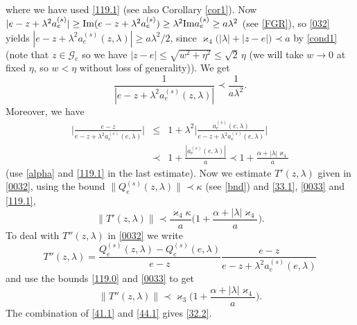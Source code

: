 \documentclass[letterpaper,onecolumn,11pt,accepted=2021-12-09]{quantumarticle}
\numberwithin{equation}{section}
\newcommand{\aes}{a_e^{(s)}}
\newcommand{\Qes}{Q_e^{(s)}}
\begin{document}
where we have used \eqref{119.1} (see also Corollary \ref{cor1}). Now $|e-z+\lambda^2\aes|\ge {\rm Im} ( e-z+\lambda^2\aes)
\ge \lambda^2{\rm Im }\aes \ge a \lambda^2$ (see \eqref{FGR}), so \eqref{032} yields $|e-z+\lambda^2 \aes(z,\lambda)|\ge a\lambda^2/2$, since $\varkappa_4\big(|\lambda| +|z-e|\big) \prec a$ by \eqref{cond1} (note that $z\in{\mathcal G}_e$ so we have $|z-e|\le \sqrt{w^2+\eta^2}\le \sqrt2 \,\eta$ (we will take $w\rightarrow 0$ at fixed $\eta$, so $w<\eta$ without loss of generality)). We get 
\begin{equation}
	\label{33.1}
	\frac{1}{|e-z+\lambda^2 \aes(z,\lambda)|}\prec \frac{1}{a \lambda^2}.
\end{equation} 
Moreover, we have
\begin{eqnarray} 
\Big| \frac{e-z}{e-z+\lambda^2\aes(e,\lambda)}\Big| &\le& 1 +\lambda^2\Big|
\frac{\aes(e,\lambda)}{e-z+\lambda^2\aes(e,\lambda)} \Big|\nonumber\\
&\prec& 1+\frac{|\aes(e,\lambda)|}{a} \prec 1+ \frac{\alpha +|\lambda|\varkappa_4}{a}
	\label{0033}
\end{eqnarray} 
(use \eqref{alpha} and \eqref{119.1} in the last estimate). Now we estimate $T'(z,\lambda)$ given in \eqref{0032}, using the bound $\|\Qes(z,\lambda)\|\prec \kappa$ (see \eqref{bnd}) and \eqref{33.1}, \eqref{0033} and \eqref{119.1},
\begin{equation}
\|T'(z,\lambda)\| \prec \frac{\varkappa_4\kappa}{a} \Big(1+\frac{\alpha +|\lambda|\varkappa_4}{a} \Big). 
\label{41.1}
\end{equation}
To deal with $T''(z,\lambda)$ in \eqref{0032} we write 
\begin{equation}
\label{32.3}
T''(z,\lambda) =\frac{\Qes(z,\lambda) -\Qes(e,\lambda)}{e-z} \frac{e-z}{e-z+\lambda^2 \aes(e,\lambda)} 
\end{equation}
and use the bounds \eqref{119.0} and  \eqref{0033}  to get
\begin{equation}
\|T''(z,\lambda)\| \prec \varkappa_3 \Big( 1+\frac{\alpha+|\lambda|\varkappa_4}{a}\Big).
\label{44.1}
\end{equation}
The combination of \eqref{41.1} and \eqref{44.1} gives \eqref{32.2}. 
\end{document}
